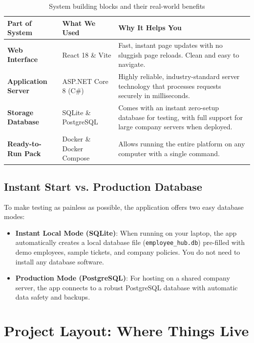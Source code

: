 \documentclass[a4paper,11pt]{article}
\begin{document}
\begin{table}[!ht]
\centering
\small
\begin{tabularx}{\textwidth}{>{\raggedright\arraybackslash\bfseries}p{3.0cm} >{\raggedright\arraybackslash}p{3.4cm} X}
\toprule
\textbf{Part of System} & \textbf{What We Used} & \textbf{Why It Helps You} \\
\midrule
Web Interface & React 18 \& Vite & Fast, instant page updates with no sluggish page reloads. Clean and easy to navigate. \\
\addlinespace
Application Server & ASP.NET Core 8 (C\#) & Highly reliable, industry-standard server technology that processes requests securely in milliseconds. \\
\addlinespace
Storage Database & SQLite \& PostgreSQL & Comes with an instant zero-setup database for testing, with full support for large company servers when deployed. \\
\addlinespace
Ready-to-Run Pack & Docker \& Docker Compose & Allows running the entire platform on any computer with a single command. \\
\bottomrule
\end{tabularx}
\caption{System building blocks and their real-world benefits}
\end{table}

\subsection{Instant Start vs. Production Database}
To make testing as painless as possible, the application offers two easy database modes:
\begin{itemize}
    \item \textbf{Instant Local Mode (SQLite)}: When running on your laptop, the app automatically creates a local database file (\texttt{employee\_hub.db}) pre-filled with demo employees, sample tickets, and company policies. You do not need to install any database software.
    \item \textbf{Production Mode (PostgreSQL)}: For hosting on a shared company server, the app connects to a robust PostgreSQL database with automatic data safety and backups.
\end{itemize}

\section{Project Layout: Where Things Live}
\end{document}
